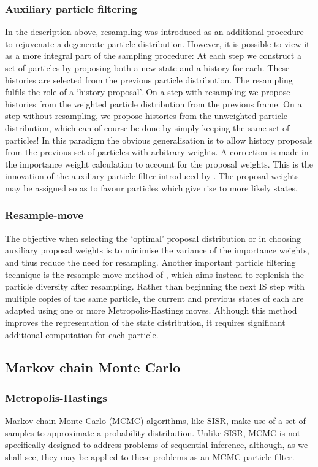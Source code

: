 \subsubsection{Auxiliary particle filtering}
In the description above, resampling was introduced as an additional procedure to rejuvenate a degenerate particle distribution. However, it is possible to view it as a more integral part of the sampling procedure: At each step we construct a set of particles by proposing both a new state and a history for each. These histories are selected from the previous particle distribution. The resampling fulfils the role of a `history proposal'. On a step with resampling we propose histories from the weighted particle distribution from the previous frame. On a step without resampling, we propose histories from the unweighted particle distribution, which can of course be done by simply keeping the same set of particles! In this paradigm the obvious generalisation is to allow history proposals from the previous set of particles with arbitrary weights. A correction is made in the importance weight calculation to account for the proposal weights. This is the innovation of the auxiliary particle filter introduced by \cite{Pitt1999}. The proposal weights may be assigned so as to favour particles which give rise to more likely states.

\subsubsection{Resample-move}
The objective when selecting the `optimal' proposal distribution or in choosing auxiliary proposal weights is to minimise the variance of the importance weights, and thus reduce the need for resampling. Another important particle filtering technique is the resample-move method of \cite{Gilks2001}, which aims instead to replenish the particle diversity after resampling. Rather than beginning the next IS step with multiple copies of the same particle, the current and previous states of each are adapted using one or more Metropolis-Hastings moves. Although this method improves the representation of the state distribution, it requires significant additional computation for each particle.



\subsection{Markov chain Monte Carlo}

\subsubsection{Metropolis-Hastings}
Markov chain Monte Carlo (MCMC) algorithms, like SISR, make use of a set of samples to approximate a probability distribution. Unlike SISR, MCMC is not specifically designed to address problems of sequential inference, although, as we shall see, they may be applied to these problems as an MCMC particle filter.

